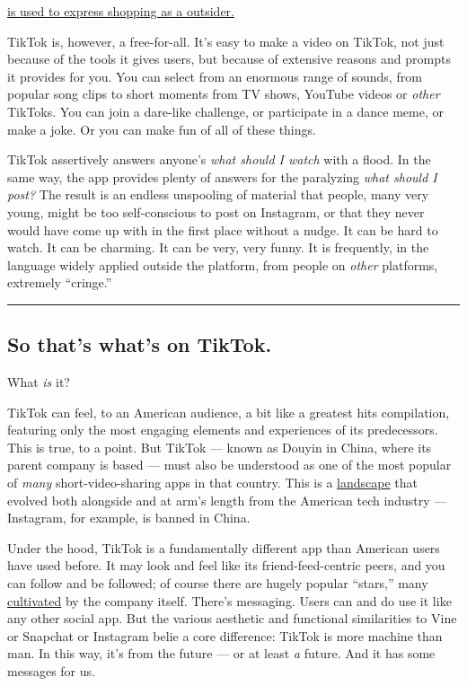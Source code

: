 \href{https://www.tiktok.com/share/video/6664754374910151941}{is used to
express shopping as a outsider.}

TikTok is, however, a free-for-all. It's easy to make a video on TikTok,
not just because of the tools it gives users, but because of extensive
reasons and prompts it provides for you. You can select from an enormous
range of sounds, from popular song clips to short moments from TV shows,
YouTube videos or \emph{other} TikToks. You can join a dare-like
challenge, or participate in a dance meme, or make a joke. Or you can
make fun of all of these things.

TikTok assertively answers anyone's \emph{what should I watch} with a
flood. In the same way, the app provides plenty of answers for the
paralyzing \emph{what should I post?} The result is an endless
unspooling of material that people, many very young, might be too
self-conscious to post on Instagram, or that they never would have come
up with in the first place without a nudge. It can be hard to watch. It
can be charming. It can be very, very funny. It is frequently, in the
language widely applied outside the platform, from people on
\emph{other} platforms, extremely ``cringe.''

\begin{center}\rule{0.5\linewidth}{\linethickness}\end{center}

\hypertarget{so-thats-whats-on-tiktok}{%
\subsection{So that's what's on
TikTok.}\label{so-thats-whats-on-tiktok}}

What \emph{is} it?

TikTok can feel, to an American audience, a bit like a greatest hits
compilation, featuring only the most engaging elements and experiences
of its predecessors. This is true, to a point. But TikTok --- known as
Douyin in China, where its parent company is based --- must also be
understood as one of the most popular of \emph{many} short-video-sharing
apps in that country. This is a
\href{https://radiichina.com/a-quick-guide-to-chinas-competing-short-video-apps/}{landscape}
that evolved both alongside and at arm's length from the American tech
industry --- Instagram, for example, is banned in China.

Under the hood, TikTok is a fundamentally different app than American
users have used before. It may look and feel like its
friend-feed-centric peers, and you can follow and be followed; of course
there are hugely popular ``stars,'' many
\href{https://technode.com/2018/06/15/8-lessons-douyin/}{cultivated} by
the company itself. There's messaging. Users can and do use it like any
other social app. But the various aesthetic and functional similarities
to Vine or Snapchat or Instagram belie a core difference: TikTok is more
machine than man. In this way, it's from the future --- or at least
\emph{a} future. And it has some messages for us.

